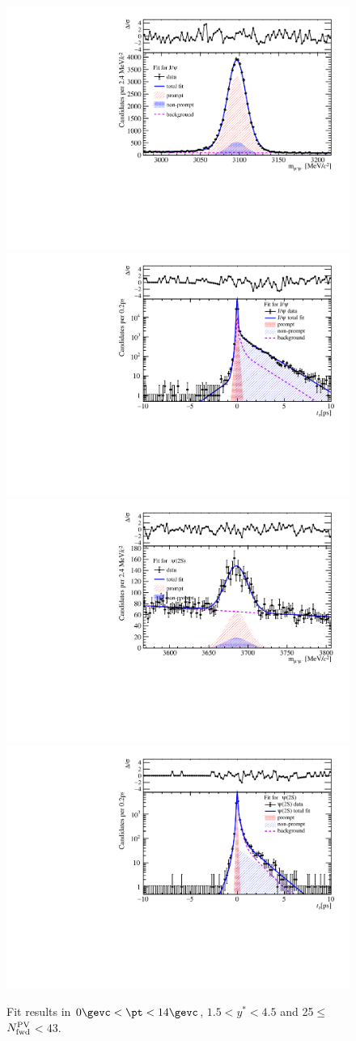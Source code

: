 \begin{figure}[H]
\begin{center}
\includegraphics[width=0.45\linewidth]{pdf/pPb/FWorkdir/TwoDimFit/ProjMass/Jpsi_n2y1pt1.pdf}
\includegraphics[width=0.45\linewidth]{pdf/pPb/FWorkdir/TwoDimFit/ProjTz/Jpsi_n2y1pt1.pdf}
\vspace*{-0.5cm}
\includegraphics[width=0.45\linewidth]{pdf/pPb/FWorkdir/TwoDimFit/ProjMass/Psi2S_n2y1pt1.pdf}
\includegraphics[width=0.45\linewidth]{pdf/pPb/FWorkdir/TwoDimFit/ProjTz/Psi2S_n2y1pt1.pdf}
\vspace*{-0.5cm}
\end{center}
\caption{Fit results in $0\gevc<\pt<14\gevc$, $1.5<y^*<4.5$ and 25$\leq$$N_{\rm fwd}^{\rm PV}$$<43$.}
\end{figure}
